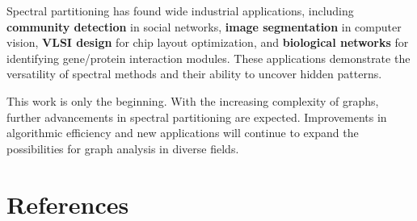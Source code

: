 \documentclass[hidelinks,12pt]{article}
\begin{document}
\noindent Spectral partitioning has found wide industrial applications, including \textbf{community detection} in social networks, \textbf{image segmentation} in computer vision, \textbf{VLSI design} for chip layout optimization, and \textbf{biological networks} for identifying gene/protein interaction modules. These applications demonstrate the versatility of spectral methods and their ability to uncover hidden patterns.
\vspace{3mm}


\noindent This work is only the beginning. With the increasing complexity of graphs, further advancements in spectral partitioning are expected. Improvements in algorithmic efficiency and new applications will continue to expand the possibilities for graph analysis in diverse fields.

\newpage
\section{References}
\end{document}
